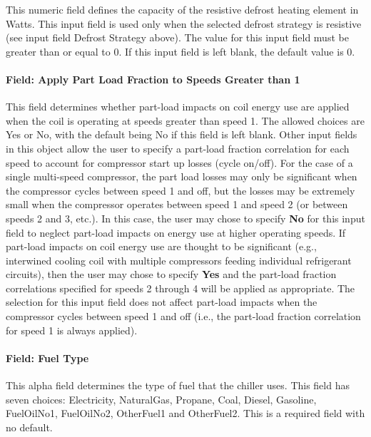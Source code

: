This numeric field defines the capacity of the resistive defrost heating element in Watts. This input field is used only when the selected defrost strategy is resistive (see input field Defrost Strategy above). The value for this input field must be greater than or equal to 0. If this input field is left blank, the default value is 0.

\paragraph{Field: Apply Part Load Fraction to Speeds Greater than 1}\label{field-apply-part-load-fraction-to-speeds-greater-than-1-1}

This field determines whether part-load impacts on coil energy use are applied when the coil is operating at speeds greater than speed 1. The allowed choices are Yes or No, with the default being No if this field is left blank. Other input fields in this object allow the user to specify a part-load fraction correlation for each speed to account for compressor start up losses (cycle on/off). For the case of a single multi-speed compressor, the part load losses may only be significant when the compressor cycles between speed 1 and off, but the losses may be extremely small when the compressor operates between speed 1 and speed 2 (or between speeds 2 and 3, etc.). In this case, the user may chose to specify \textbf{No} for this input field to neglect part-load impacts on energy use at higher operating speeds. If part-load impacts on coil energy use are thought to be significant (e.g., interwined cooling coil with multiple compressors feeding individual refrigerant circuits), then the user may chose to specify \textbf{Yes} and the part-load fraction correlations specified for speeds 2 through 4 will be applied as appropriate. The selection for this input field does not affect part-load impacts when the compressor cycles between speed 1 and off (i.e., the part-load fraction correlation for speed 1 is always applied).

\paragraph{Field: Fuel Type}\label{field-fuel-type-1-000}

This alpha field determines the type of fuel that the chiller uses. This field has seven choices: Electricity, NaturalGas, Propane, Coal, Diesel, Gasoline, FuelOilNo1, FuelOilNo2, OtherFuel1 and OtherFuel2. This is a required field with no default.

